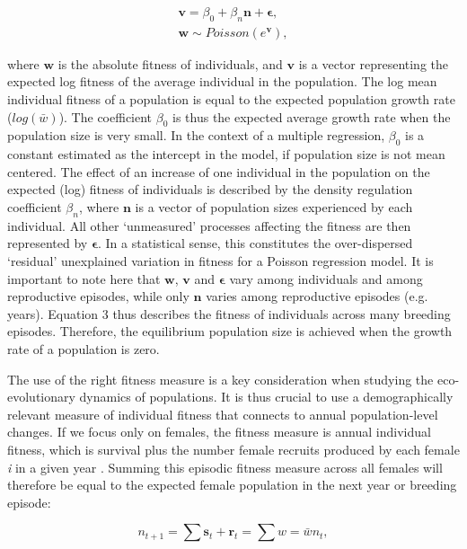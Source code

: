 \documentclass{article}
\begin{document}
	\begin{subequations}
		\begin{gather} \label{eq: log-linear}
		\bm{v}=\beta_{0} +\beta_{n} \bm{n} +  \bm{\epsilon}, \\
		\bm{w} \sim Poisson(e^{\bm{v}}),
		\end{gather}
	\end{subequations}
	
	\noindent where $\bm{w}$ is the absolute fitness of individuals, and $\bm{v}$ is a vector representing the expected log fitness of the average individual in the population. The log mean individual fitness of a population is equal to the expected population growth rate ($log(\bar{w})$). The coefficient $\beta_{0}$ is thus the expected average growth rate when the population size is very small. In the context of a multiple regression, $\beta_{0}$ is a constant estimated as the intercept in the model, if population size is not mean centered. The effect of an increase of one individual in the population on the expected (log) fitness of individuals is described by the density regulation coefficient $\beta_{n}$, where $\bm{n}$ is a vector of population sizes experienced by each individual. All other `unmeasured' processes affecting the fitness are then represented by $\bm{\epsilon}$. In a statistical sense, this constitutes the over-dispersed `residual' unexplained variation in fitness for a Poisson regression model. It is important to note here that $\bm{w}$, $\bm{v}$ and $\bm{\epsilon}$ vary among individuals and among reproductive episodes, while only $\bm{n}$ varies among reproductive episodes (e.g. years). Equation 3 thus describes the fitness of individuals across many breeding episodes. Therefore, the equilibrium population size is achieved when the growth rate of a population is zero. 
	
	The use of the right fitness measure is a key consideration when studying the eco-evolutionary dynamics of populations. It is thus crucial to use a demographically relevant measure of individual fitness that connects to annual population-level changes. If we focus only on females, the fitness measure is annual individual fitness, which is survival plus the number female recruits produced by each female \textit{i} in a given year \citep{Saether2015}. Summing this episodic fitness measure across all females will therefore be equal to the expected female population in the next year or breeding episode: 
	
	\begin{equation} \label{eq: fitness}
	n_{t+1}=\sum \bm{s}_t + \bm{r}_t= \sum w=\bar{w}n_{t}, 
	\end{equation}
	
\end{document}

